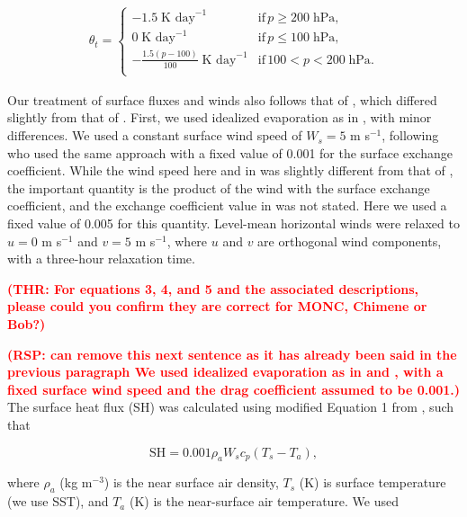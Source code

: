 \documentclass[draft]{agujournal2019}
\newcommand{\todo}[1]{\textcolor{red}{\textbf{(#1)}}}
\begin{document}
\begin{align}
 \theta_t = \begin{cases}
    -1.5\; \textrm{K day}^{-1} & \textrm{if}\, p \geq 200\; \textrm{hPa}, \\
    0\; \textrm{K day}^{-1} & \textrm{if}\, p \leq 100\; \textrm{hPa}, \\
    -\frac{1.5 (p-100)}{100}\; \textrm{K day}^{-1} & \textrm{if}\, 
    100 < p < 200\; \textrm{hPa}. \\
 \end{cases}
\end{align}

Our treatment of surface fluxes and winds also follows that of
, which differed slightly from that of
. First, we used idealized evaporation as in
, with minor differences. We used a constant surface wind
speed of $W_s = 5$ m s$^{-1}$, following  who used the
same approach with a fixed value of 0.001 for the surface exchange coefficient.
While the wind speed here and in  was slightly different
from that of , the important quantity is the product of
the wind with the surface exchange coefficient, and the exchange coefficient
value in  was not stated. Here we used a fixed value of
0.005 for this quantity. Level-mean horizontal winds were relaxed to $u = 0$ m
s$^{-1}$ and $v = 5$ m s$^{-1}$, where $u$ and $v$ are orthogonal wind
components, with a three-hour relaxation time.

\todo{THR: For equations 3, 4, and 5 and the associated descriptions, please
could you confirm they are correct for MONC, Chimene or Bob?}

\todo{RSP: can remove this next sentence as it has already been said in the previous paragraph We used idealized evaporation as in \citeA{Chua_GRL_2019} and
\citeA{Hwong_JAMES_2021}, with a fixed surface wind speed and the drag
coefficient assumed to be 0.001.} The surface heat flux (SH) was calculated
using modified Equation 1 from , such that

\begin{equation}
\textrm{SH} = 0.001 \rho_a W_s c_p (T_s - T_a),
\end{equation}

\noindent where $\rho_a$ (kg m$^{-3}$) is the near surface air density, $T_s$
(K) is surface temperature (we use SST), and $T_a$ (K) is the near-surface air
temperature. We used 
\end{document}

